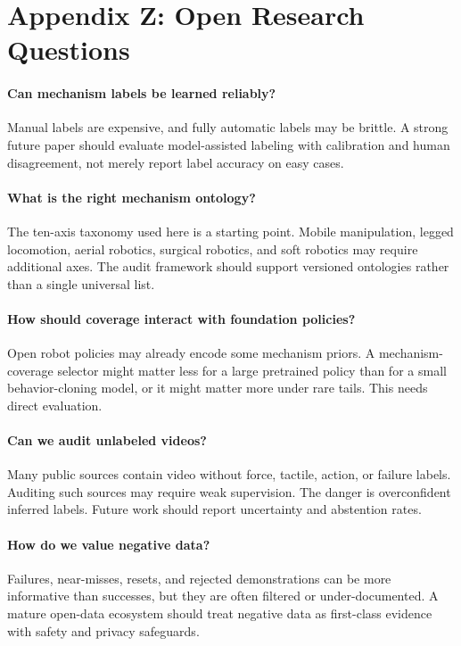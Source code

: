 \documentclass{article}
\begin{document}
\section{Appendix Z: Open Research Questions}
\paragraph{Can mechanism labels be learned reliably?}
Manual labels are expensive, and fully automatic labels may be brittle. A strong future paper should evaluate model-assisted labeling with calibration and human disagreement, not merely report label accuracy on easy cases.

\paragraph{What is the right mechanism ontology?}
The ten-axis taxonomy used here is a starting point. Mobile manipulation, legged locomotion, aerial robotics, surgical robotics, and soft robotics may require additional axes. The audit framework should support versioned ontologies rather than a single universal list.

\paragraph{How should coverage interact with foundation policies?}
Open robot policies may already encode some mechanism priors. A mechanism-coverage selector might matter less for a large pretrained policy than for a small behavior-cloning model, or it might matter more under rare tails. This needs direct evaluation.

\paragraph{Can we audit unlabeled videos?}
Many public sources contain video without force, tactile, action, or failure labels. Auditing such sources may require weak supervision. The danger is overconfident inferred labels. Future work should report uncertainty and abstention rates.

\paragraph{How do we value negative data?}
Failures, near-misses, resets, and rejected demonstrations can be more informative than successes, but they are often filtered or under-documented. A mature open-data ecosystem should treat negative data as first-class evidence with safety and privacy safeguards.
\end{document}
